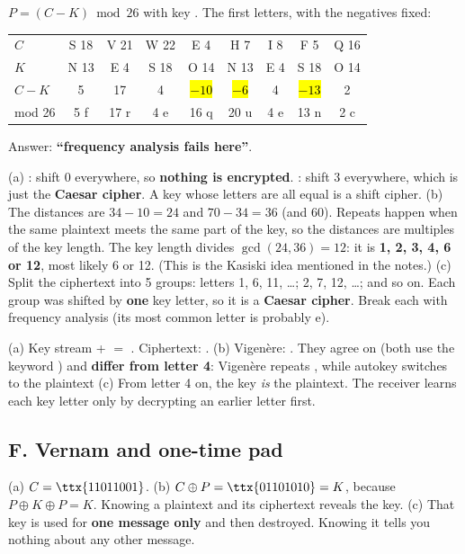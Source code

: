 \ans $P = (C - K) \bmod 26$ with key . The first letters, with the negatives fixed:
\begin{center}\small\setlength{\tabcolsep}{4pt}
\begin{tabular}{@{}l*{8}{c}@{}}
\toprule
$C$ & S 18 & V 21 & W 22 & E 4 & H 7 & I 8 & F 5 & Q 16\\
$K$ & N 13 & E 4 & S 18 & O 14 & N 13 & E 4 & S 18 & O 14\\
$C-K$ & 5 & 17 & 4 & \hl{$-10$} & \hl{$-6$} & 4 & \hl{$-13$} & 2\\
mod 26 & 5 f & 17 r & 4 e & 16 q & 20 u & 4 e & 13 n & 2 c\\
\bottomrule
\end{tabular}
\end{center}
Answer: \textbf{``frequency analysis fails here''}.

\ans (a) : shift 0 everywhere, so \textbf{nothing is encrypted}. : shift 3 everywhere, which is just the \textbf{Caesar cipher}. A key whose letters are all equal is a shift cipher.
(b) The distances are $34-10=24$ and $70-34=36$ (and $60$). Repeats happen when the same plaintext meets the same part of the key, so the distances are multiples of the key length. The key length divides $\gcd(24,36) = 12$: it is \textbf{1, 2, 3, 4, 6 or 12}, most likely 6 or 12. (This is the Kasiski idea mentioned in the notes.)
(c) Split the ciphertext into 5 groups: letters 1, 6, 11, \dots; 2, 7, 12, \dots; and so on. Each group was shifted by \textbf{one} key letter, so it is a \textbf{Caesar cipher}. Break each with frequency analysis (its most common letter is probably e).

\ans (a) Key stream  +  $=$ . Ciphertext: \textbf{}.
(b) Vigen\`ere: . They agree on  (both use the keyword ) and \textbf{differ from letter 4}: Vigen\`ere repeats , while autokey switches to the plaintext 
(c) From letter 4 on, the key \emph{is} the plaintext. The receiver learns each key letter only by decrypting an earlier letter first.

\subsection*{F. Vernam and one-time pad}

\ans (a) $C = \ttx{11011001}$.
(b) $C \oplus P = \ttx{01101010} = K$, because $P \oplus K \oplus P = K$. Knowing a plaintext and its ciphertext reveals the key.
(c) That key is used for \textbf{one message only} and then destroyed. Knowing it tells you nothing about any other message.

